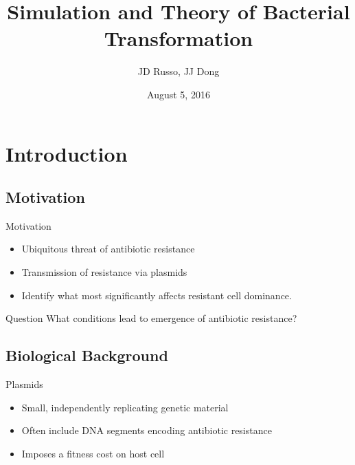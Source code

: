 \documentclass[10pt, notes]{beamer}       %
\title{Simulation and Theory of Bacterial Transformation}
\date{August 5, 2016}
\author{JD Russo, JJ Dong}
\institute{Department of Physics and Astronomy\\Bucknell University}
\begin{document}
\maketitle

\section{Introduction}

\subsection{Motivation}
\begin{frame}{Motivation}
  \begin{itemize}
    \item Ubiquitous threat of antibiotic resistance
    \item Transmission of resistance via plasmids
    \item Identify what most significantly affects resistant cell dominance.
  \end{itemize}

  \vspace*{\fill}
    \begin{alertblock}{Question}
      What conditions lead to emergence of antibiotic resistance?
    \end{alertblock}
  \vspace*{\fill}

\end{frame}



\subsection{Biological Background}
\begin{frame}[fragile]{Plasmids}
  \begin{itemize}
    \item Small, independently replicating genetic material
    \item Often include DNA segments encoding antibiotic resistance
    \item Imposes a fitness cost on host cell
  \end{itemize}
\end{frame}
\end{document}
